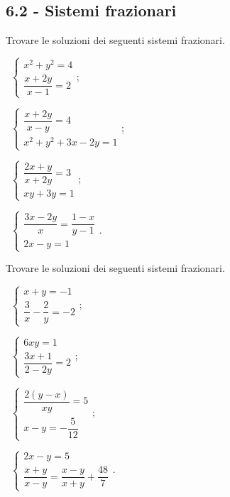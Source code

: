 \subsection*{6.2 - Sistemi frazionari}

\begin{esercizio}[\Ast]
 \label{ese:6.16}
Trovare le soluzioni dei seguenti sistemi frazionari.
\begin{multicols}{2}
 \begin{enumeratea}{\spazielenx
 \item~$\left\{\begin{array}{l}x^2+y^2=4\\\dfrac{x+2y}{x-1}=2\end{array}\right.$;
 \item~$\left\{\begin{array}{l}\dfrac{x+2y}{x-y}=4\\x^2+y^2+3x-2y=1\end{array}\right.$;
 \item~$\left\{\begin{array}{l}\dfrac{2x+y}{x+2y}=3\\xy+3y=1\end{array}\right.$;
 \item~$\left\{\begin{array}{l}\dfrac{3x-2y} x=\dfrac{1-x}{y-1}\\2x-y=1\end{array}\right.$.}
 \end{enumeratea}
 \end{multicols}
\end{esercizio}

\begin{esercizio}[\Ast]
 \label{ese:6.17}
Trovare le soluzioni dei seguenti sistemi frazionari.
\begin{multicols}{2}
 \begin{enumeratea}{\spazielenx
 \item~$\left\{\begin{array}{l}x+y=-1\\\dfrac{3}{x}-\dfrac{2}{y}=-2\end{array}\right.$;
 \item~$\left\{\begin{array}{l}6xy=1\\\dfrac{3x+1}{2-2y}=2\end{array}\right.$;
 \item~$\left\{\begin{array}{l}\dfrac{2(y-x)}{xy}=5\\x-y=-\dfrac{5}{12}\end{array}\right.$;
 \item~$\left\{\begin{array}{l}2x-y=5\\\dfrac{x+y}{x-y}=\dfrac{x-y}{x+y}+\dfrac{48}{7}\end{array}\right.$.}
 \end{enumeratea}
 \end{multicols}
\end{esercizio}

